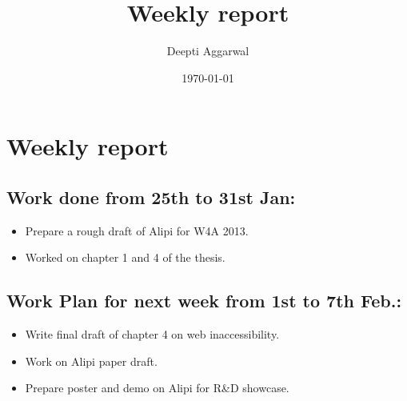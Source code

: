 \documentclass[11pt]{article}
\title{Weekly report}
\author{Deepti Aggarwal}
\date{\today}
\begin{document}
\maketitle

\setcounter{tocdepth}{3}
\vspace*{1cm}
\section{Weekly report}
\label{sec-1}


\subsection{Work done from 25th to 31st Jan:}
\label{sec-1-1}
\begin{itemize}
\item Prepare a rough draft of Alipi for W4A 2013.
\item Worked on chapter 1 and 4 of the thesis.
\end{itemize}


\subsection{Work Plan for next week from 1st to 7th Feb.:}
\label{sec-1-2}
\begin{itemize}
\item Write final draft of chapter 4 on web inaccessibility.
\item Work on Alipi paper draft. 
\item Prepare poster and demo on Alipi for R\&D showcase.
\end{itemize}
\end{document}
